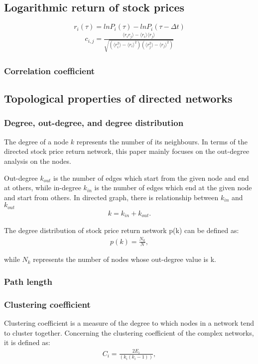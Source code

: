 \subsection{Logarithmic return of stock prices}
$$r_i(\tau)=lnP_i(\tau)-lnP_i(\tau-\Delta t)$$
\begin{eqnarray}\label{equ:corr}
c_{i,j}=\frac{\langle r_ir_j \rangle-\langle r_i\rangle \langle r_j\rangle}{\sqrt{(\langle r_i^2\rangle-\langle r_i\rangle^2)(\langle r_j^2\rangle-\langle r_j\rangle^2)}}
\end{eqnarray}
\subsubsection{Correlation coefficient}


\subsection{Topological properties of directed networks}
\label{sec:aim}
\subsubsection{Degree, out-degree, and degree distribution}
The degree of a node $k$ represents the number of its neighbours. In terms of the directed stock price return network, this paper mainly focuses on the out-degree analysis on the nodes.

Out-degree $k_{out}$ is the number of edges which start from the given node and end at others, while in-degree $k_{in}$ is the number of edges which end at the given node and start from others. In directed graph, there is relationship between $k_{in}$ and $k_{out}$
\begin{eqnarray}
k=k_{in}+k_{out}.
\end{eqnarray}

The degree distribution of stock price return network p(k) can be defined as:
\begin{eqnarray}
p(k)=\frac{N_k}{N},
\end{eqnarray}

while $N_k$ represents the number of nodes whose out-degree value is k.

\subsubsection{Path length}

\subsubsection{Clustering coefficient} %
Clustering coefficient is a measure of the degree to which nodes in a network tend to cluster together. Concerning the clustering coefficient of the complex networks, it is defined as:
\begin{eqnarray}
C_i=\frac{2E_i}{(k_i(k_i-1))},
\end{eqnarray}

